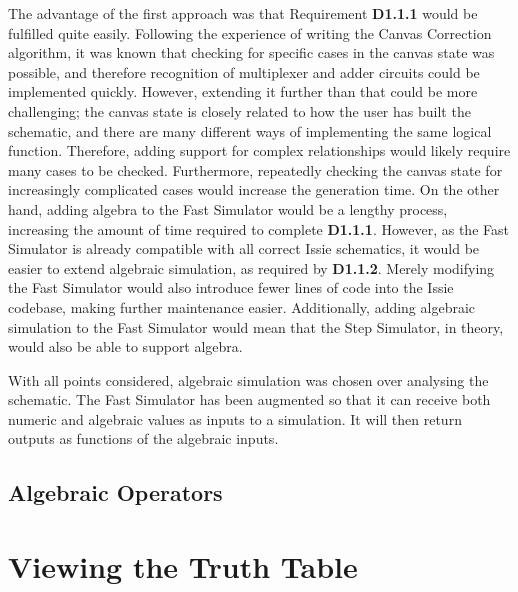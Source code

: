 The advantage of the first approach was that Requirement \textbf{D1.1.1} would be fulfilled quite easily. Following the experience of writing the Canvas Correction algorithm, it was known that checking for specific cases in the canvas state was possible, and therefore recognition of multiplexer and adder circuits could be implemented quickly. However, extending it further than that could be more challenging; the canvas state is closely related to how the user has built the schematic, and there are many different ways of implementing the same logical function. Therefore, adding support for complex relationships would likely require many cases to be checked. Furthermore, repeatedly checking the canvas state for increasingly complicated cases would increase the generation time. On the other hand, adding algebra to the Fast Simulator would be a lengthy process, increasing the amount of time required to complete \textbf{D1.1.1}. However, as the Fast Simulator is already compatible with all correct Issie schematics, it would be easier to extend algebraic simulation, as required by \textbf{D1.1.2}. Merely modifying the Fast Simulator would also introduce fewer lines of code into the Issie codebase, making further maintenance easier. Additionally, adding algebraic simulation to the Fast Simulator would mean that the Step Simulator, in theory, would also be able to support algebra. 

With all points considered, algebraic simulation was chosen over analysing the schematic. The Fast Simulator has been augmented so that it can receive both numeric and algebraic values as inputs to a simulation. It will then return outputs as functions of the algebraic inputs.

\subsection{Algebraic Operators}

\section{Viewing the Truth Table} \label{sec:ttView}